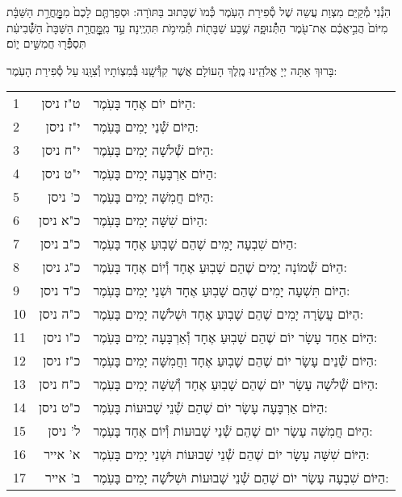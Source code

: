 \documentclass[twoside, openany, parskip=half, 11pt]{book}
\begin{document}
הִנְ֯נִי מְ֯קַיֵּם מִצְוַת עֲשֵה שֶׁל סְ֯פִירַת הָעֽׂמֶר כְּ֯מוׂ שֶׁכָּתוּב בַּתּוׂרָה: וּסְפַרְתֶּ֤ם לָכֶם֙ מִמׇׇׇׇׇׇׇׇׇׇׇׇּחֳרַ֣ת הַשַּׁבָּ֔ת מִיּוֹם֙ הֲבִ֣יאֲכֶ֔ם אֶת־עֹ֖מֶר הַתְּ֯֯נוּפָ֑ה שֶׁ֥בַע שַׁבָּת֖וֹת תְּ֯מִימֹ֥ת תִּהְיֶֽינָה׃ עַ֣ד מִֽמׇׇׇׇׇׇׇׇׇׇׇׇּחֳרַ֤ת הַשַּׁבָּת֙ הַשְּׁ֯֯בִיעִ֔ת תִּסְפְּ֯֯ר֖וּ חֲמִשִּׁ֣ים י֑וֹם׃

בָּרוּךְ אַתָּה יְיָ אֱלֹהֵֽינוּ מֶֽלֶךְ הָעוֹלָם אֲשֶׁר קִדְּ֯שָֽׁנוּ בְּ֯מִצְוֹתָיו וְ֯צִוָּֽנוּ עַל סְ֯פִירַת הָעֹֽמֶר:\\

\begin{scriptsize}
\begin{longtable}{ l | r | p{} }
1 & ט"ז ניסן & הַיּוֹם יוֹם אֶחָד בָּעֹֽמֶר: \\
2 & י"ז ניסן & הַיּוֹם שְׁ֯נֵי יָמִים בָּעֹֽמֶר: \\
3 & י"ח ניסן & הַיּוֹם שְׁ֯לֹשָׁה יָמִים בָּעֹֽמֶר: \\
4 & י"ט ניסן & הַיּוֹם אַרְבָּעָה יָמִים בָּעֹֽמֶר: \\
5 & כ' ניסן & הַיּוֹם חֲמִשָּׁה יָמִים בָּעֹֽמֶר: \\
6 & כ"א ניסן & הַיוֹם שִׁשָּׁה יָמִים בָּעֹֽמֶר: \\
7 & כ"ב ניסן & הַיּוֹם שִׁבְעָה יָמִים שֶׁהֵם שָׁבֽוּעַ אֶחָד בָּעֹֽמֶר: \\
8 & כ"ג ניסן & הַיּוֹם שְׁ֯מוֹנָה יָמִים שֶׁהֵם שָׁבֽוּעַ אֶחָד וְ֯יוֹם אֶחָד בָּעֹֽמֶר: \\
9 & כ"ד ניסן & הַיּוֹם תִּשְׁעָה יָמִים שֶׁהֵם שָׁבֽוּעַ אֶחָד וּשְׁנֵי יָמִים בָּעֹֽמֶר: \\
10 & כ"ה ניסן & הַיּוֹם עֲשָׂרָה יָמִים שֶׁהֵם שָׁבֽוּעַ אֶחָד וּשְׁלֹשָׁה יָמִים בָּעֹֽמֶר: \\
11 & כ"ו ניסן & הַיּוֹם אַחַד עָשָׂר יוֹם שֶׁהֵם שָׁבֽוּעַ אֶחָד וְ֯אַרְבָּעָה יָמִים בָּעֹֽמֶר: \\
12 & כ"ז ניסן & הַיּוֹם שְׁ֯נֵים עָשָׂר יוֹם שֶׁהֵם שָׁבֽוּעַ אֶחָד וַחֲמִשָּׁה יָמִים בָּעֹֽמֶר: \\
13 & כ"ח ניסן & הַיּוֹם שְׁ֯לֹשָׁה עָשָׂר יוֹם שֶׁהֵם שָׁבֽוּעַ אֶחָד וְ֯שִׁשָּׁה יָמִים בָּעֹֽמֶר: \\
14 & כ"ט ניסן & הַיּוֹם אַרְבָּעָה עָשָׂר יוֹם שֶׁהֵם שְׁ֯נֵי שָׁבוּעוֹת בָּעֹֽמֶר: \\
15 & ל' ניסן & הַיּוֹם חֲמִשָּׁה עָשָׂר יוֹם שֶׁהֵם שְׁ֯נֵי שָׁבוּעוֹת וְ֯יוֹם אֶחָד בָּעֹֽמֶר: \\
16 & א' אייר & הַיּוֹם שִׁשָּׁה עָשָׂר יוֹם שֶׁהֵם שְׁ֯נֵי שָׁבוּעוֹת וּשְׁנֵי יָמִים בָּעֹֽמֶר: \\
17 & ב' אייר & הַיּוֹם שִׁבְעָה עָשָׂר יוֹם שֶׁהֵם שְׁ֯נֵי שָׁבוּעוֹת וּשְׁלֹשָׁה יָמִים בָּעֹֽמֶר: \\

\end{longtable}
\end{scriptsize}
\end{document}
